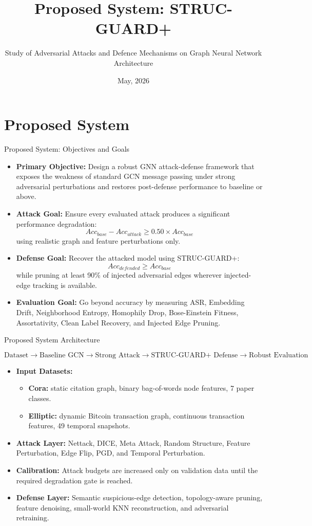 \documentclass{beamer}
\title{Proposed System: STRUC-GUARD+}
\author{Study of Adversarial Attacks and Defence Mechanisms on Graph Neural Network Architecture}
\date{May, 2026}
\begin{document}
\section{Proposed System}

\begin{frame}{Proposed System: Objectives and Goals}
\small
\begin{itemize}
    \item \textbf{Primary Objective:} Design a robust GNN attack-defense framework that exposes the weakness of standard GCN message passing under strong adversarial perturbations and restores post-defense performance to baseline or above.
    \item \textbf{Attack Goal:} Ensure every evaluated attack produces a significant performance degradation:
    \[
        Acc_{base}-Acc_{attack} \geq 0.50 \times Acc_{base}
    \]
    using realistic graph and feature perturbations only.
    \item \textbf{Defense Goal:} Recover the attacked model using STRUC-GUARD+:
    \[
        Acc_{defended} \geq Acc_{base}
    \]
    while pruning at least 90\% of injected adversarial edges wherever injected-edge tracking is available.
    \item \textbf{Evaluation Goal:} Go beyond accuracy by measuring ASR, Embedding Drift, Neighborhood Entropy, Homophily Drop, Bose-Einstein Fitness, Assortativity, Clean Label Recovery, and Injected Edge Pruning.
\end{itemize}
\end{frame}

\begin{frame}{Proposed System Architecture}
\small
\begin{tcolorbox}[colback=gray!8,colframe=black,title=End-to-End Pipeline]
\[
\text{Dataset} \rightarrow \text{Baseline GCN} \rightarrow \text{Strong Attack}
\rightarrow \text{STRUC-GUARD+ Defense} \rightarrow \text{Robust Evaluation}
\]
\end{tcolorbox}

\begin{itemize}
    \item \textbf{Input Datasets:}
    \begin{itemize}
        \item \textbf{Cora:} static citation graph, binary bag-of-words node features, 7 paper classes.
        \item \textbf{Elliptic:} dynamic Bitcoin transaction graph, continuous transaction features, 49 temporal snapshots.
    \end{itemize}
    \item \textbf{Attack Layer:} Nettack, DICE, Meta Attack, Random Structure, Feature Perturbation, Edge Flip, PGD, and Temporal Perturbation.
    \item \textbf{Calibration:} Attack budgets are increased only on validation data until the required degradation gate is reached.
    \item \textbf{Defense Layer:} Semantic suspicious-edge detection, topology-aware pruning, feature denoising, small-world KNN reconstruction, and adversarial retraining.
\end{itemize}
\end{frame}
\end{document}
